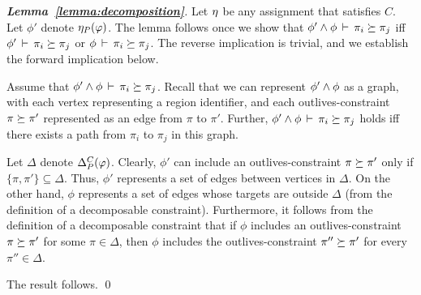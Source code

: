 
\begin{proof}[\textbf{Lemma~\ref{lemma:decomposition}}]
  Let $\eta$ be any assignment that satisfies $C$.
  Let $\phi'$ denote $\eta_P(\varphi)$.
  The lemma follows once we show that
  $\phi' \wedge \phi\,\vdash\,\pi_i \succeq \pi_j$ iff
  $\phi'\,\vdash\,\pi_i \succeq \pi_j$ or
  $\phi\,\vdash\,\pi_i \succeq \pi_j$.
  The reverse implication is trivial, and we establish the forward implication below.

  Assume that $\phi' \wedge \phi\,\vdash\,\pi_i \succeq \pi_j$.
  Recall that we can represent $\phi' \wedge \phi$ as a graph, with each vertex
  representing a region identifier, and each outlives-constraint $\pi \succeq \pi'$
  represented as an edge from $\pi$ to $\pi'$. Further,
  $\phi' \wedge \phi\,\vdash\,\pi_i \succeq \pi_j$ holds iff there exists a path
  from $\pi_i$ to $\pi_j$ in this graph.

  Let $\Delta$ denote $\Delta_P^C(\varphi)$.
  Clearly, $\phi'$ can include an outlives-constraint $\pi \succeq \pi'$ only if
  $\{ \pi, \pi' \} \subseteq \Delta$.
  Thus, $\phi'$ represents a set of edges between vertices in $\Delta$.
  On the other hand, $\phi$ represents a set of edges whose targets are outside $\Delta$
  (from the definition of a decomposable constraint).
  Furthermore, it follows from the definition of a decomposable constraint that
  if $\phi$ includes an outlives-constraint $\pi \succeq \pi'$ for some $\pi \in \Delta$,
  then $\phi$ includes the outlives-constraint $\pi'' \succeq \pi'$ for every $\pi'' \in \Delta$.

  The result follows.
\qed
\end{proof}


